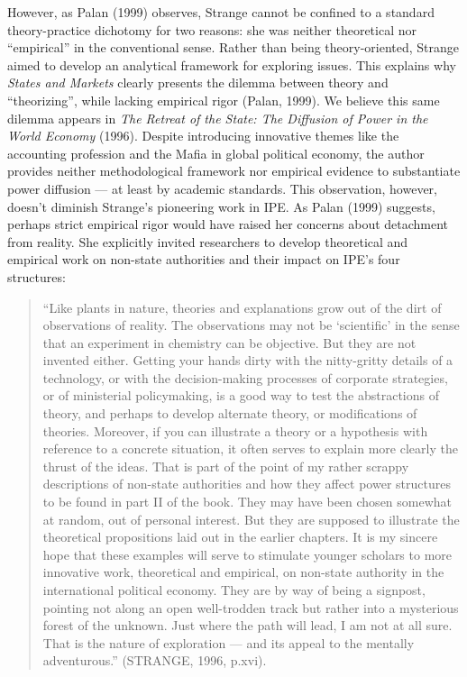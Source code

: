 However, as Palan (1999) observes, Strange cannot be confined to a standard theory-practice dichotomy for two reasons: she was neither theoretical nor ``empirical'' in the conventional sense. Rather than being theory-oriented, Strange aimed to develop an analytical framework for exploring issues. This explains why \textit{States and Markets} clearly presents the dilemma between theory and ``theorizing'', while lacking empirical rigor (Palan, 1999). We believe this same dilemma appears in \textit{The Retreat of the State: The Diffusion of Power in the World Economy} (1996). Despite introducing innovative themes like the accounting profession and the Mafia in global political economy, the author provides neither methodological framework nor empirical evidence to substantiate power diffusion --- at least by academic standards. This observation, however, doesn't diminish Strange's pioneering work in IPE. As Palan (1999) suggests, perhaps strict empirical rigor would have raised her concerns about detachment from reality. She explicitly invited researchers to develop theoretical and empirical work on non-state authorities and their impact on IPE's four structures:

\begin{quote}
``Like plants in nature, theories and explanations grow out of the dirt of observations of reality. The observations may not be `scientific' in the sense that an experiment in chemistry can be objective. But they are not invented either. Getting your hands dirty with the nitty-gritty details of a technology, or with the decision-making processes of corporate strategies, or of ministerial policymaking, is a good way to test the abstractions of theory, and perhaps to develop alternate theory, or modifications of theories. Moreover, if you can illustrate a theory or a hypothesis with reference to a concrete situation, it often serves to explain more clearly the thrust of the ideas. That is part of the point of my rather scrappy descriptions of non-state authorities and how they affect power structures to be found in part II of the book. They may have been chosen somewhat at random, out of personal interest. But they are supposed to illustrate the theoretical propositions laid out in the earlier chapters. It is my sincere hope that these examples will serve to stimulate younger scholars to more innovative work, theoretical and empirical, on non-state authority in the international political economy. They are by way of being a signpost, pointing not along an open well-trodden track but rather into a mysterious forest of the unknown. Just where the path will lead, I am not at all sure. That is the nature of exploration --- and its appeal to the mentally adventurous.'' (STRANGE, 1996, p.xvi).
\end{quote}

